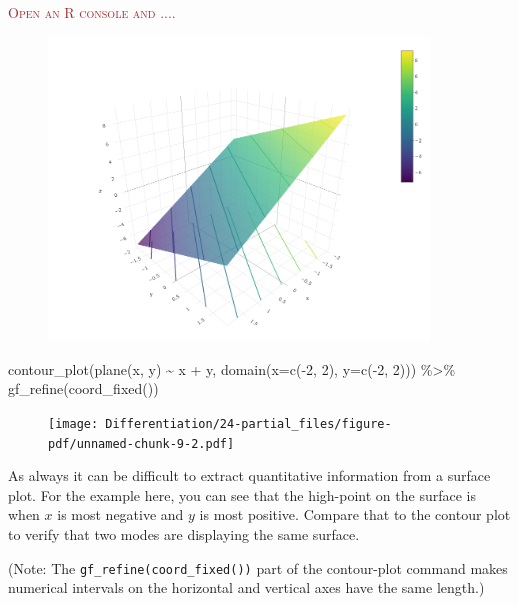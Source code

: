 \documentclass[
  letterpaper,
  DIV=11,
  numbers=noendperiod,
  oneside]{scrreprt}
\newenvironment{Shaded}{\begin{snugshade}}{\end{snugshade}}
\newcommand{\AttributeTok}[1]{\textcolor[rgb]{0.40,0.46,0.14}{#1}}
\newcommand{\DecValTok}[1]{\textcolor[rgb]{0.68,0.00,0.00}{#1}}
\newcommand{\FunctionTok}[1]{\textcolor[rgb]{0.28,0.35,0.67}{#1}}
\newcommand{\NormalTok}[1]{\textcolor[rgb]{0.00,0.46,0.62}{#1}}
\newcommand{\SpecialCharTok}[1]{\textcolor[rgb]{0.37,0.37,0.37}{#1}}
\newenvironment{scaffolding}%
{%
\textcolor{brown}{\hrulefill}%
  \par\vspace{.3\baselineskip}%
  \textcolor{brown}{\scshape Open an R console and ....}%
  \par\vspace{\baselineskip}%
}%
{\textcolor{brown}{\hrulefill}}
\begin{document}
\begin{scaffolding}
\begin{figure}[H]

{\centering \includegraphics[width=0.9\textwidth,height=\textheight]{Differentiation/www/plane-3d.png}

}

\end{figure}

\begin{Shaded}
\begin{Highlighting}[]
\FunctionTok{contour\_plot}\NormalTok{(}\FunctionTok{plane}\NormalTok{(x, y) }\SpecialCharTok{\textasciitilde{}}\NormalTok{ x }\SpecialCharTok{+}\NormalTok{ y, }\FunctionTok{domain}\NormalTok{(}\AttributeTok{x=}\FunctionTok{c}\NormalTok{(}\SpecialCharTok{{-}}\DecValTok{2}\NormalTok{, }\DecValTok{2}\NormalTok{), }\AttributeTok{y=}\FunctionTok{c}\NormalTok{(}\SpecialCharTok{{-}}\DecValTok{2}\NormalTok{, }\DecValTok{2}\NormalTok{))) }\SpecialCharTok{\%\textgreater{}\%}
  \FunctionTok{gf\_refine}\NormalTok{(}\FunctionTok{coord\_fixed}\NormalTok{())}
\end{Highlighting}
\end{Shaded}

\begin{figure}[H]

{\centering \texttt{[image: Differentiation/24-partial\_files/figure-pdf/unnamed-chunk-9-2.pdf]}

}

\end{figure}

As always it can be difficult to extract quantitative information from a
surface plot. For the example here, you can see that the high-point on
the surface is when \(x\) is most negative and \(y\) is most positive.
Compare that to the contour plot to verify that two modes are displaying
the same surface.

(Note: The \texttt{gf\_refine(coord\_fixed())} part of the contour-plot
command makes numerical intervals on the horizontal and vertical axes
have the same length.)

\end{scaffolding}
\end{document}
